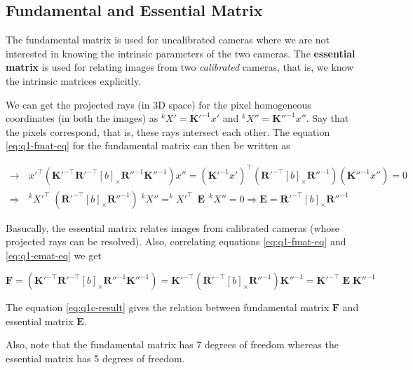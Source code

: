 
\subsection{Fundamental and Essential Matrix}

The fundamental matrix is used for uncalibrated cameras where we are not interested in knowing the intrinsic parameters of the two cameras. The \textbf{essential matrix} is used for relating images from two \textit{calibrated} cameras, that is, we know the intrinsic matrices explicitly.

We can get the projected rays (in 3D space) for the pixel homogeneous coordinates (in both the images) as $^kX' = \mathbf{K}'^{-1} x'$ and $^kX'' = \mathbf{K}''^{-1} x''$. Say that the pixels correspond, that is, these rays intersect each other. The equation \ref{eq:q1-fmat-eq} for the fundamental matrix can then be written as

\begin{align}
    \rightarrow& \,
    x'^\top \left ( \mathbf{K}'^{-\top} \mathbf{R}'^{-\top} \left [ b \right ]_\times \mathbf{R}''^{-1} \mathbf{K}''^{-1} \right ) x'' = \left ( \mathbf{K}'^{-1}x' \right )^\top  \left ( \mathbf{R}'^{-\top} \left [ b \right ]_\times \mathbf{R}''^{-1} \right ) \left ( \mathbf{K}''^{-1} x'' \right ) = 0
    \nonumber \\
    \Rightarrow& \, ^kX'^\top \; \left ( \mathbf{R}'^{-\top} \left [ b \right ]_\times \mathbf{R}''^{-1} \right ) \; ^kX'' = ^kX'^\top \;\, \mathbf{E} \;\, ^kX'' = 0
    \Rightarrow \mathbf{E} = \mathbf{R}'^{-\top} \left [ b \right ]_\times \mathbf{R}''^{-1}
    \label{eq:q1-emat-eq}
\end{align}

Basucally, the essential matrix relates images from calibrated cameras (whose projected rays can be resolved). Also, correlating equations \ref{eq:q1-fmat-eq} and \ref{eq:q1-emat-eq} we get

\begin{equation}
    \mathbf{F} = \left ( \mathbf{K}'^{-\top} \mathbf{R}'^{-\top} \left [ b \right ]_\times \mathbf{R}''^{-1} \mathbf{K}''^{-1} \right ) = \mathbf{K}'^{-\top} \left ( \mathbf{R}'^{-\top} \left [ b \right ]_\times \mathbf{R}''^{-1} \right ) \mathbf{K}''^{-1} = \mathbf{K}'^{-\top} \; \mathbf{E} \; \mathbf{K}''^{-1}
    \label{eq:q1c-result}
\end{equation}

The equation \ref{eq:q1c-result} gives the relation between fundamental matrix $\mathbf{F}$ and essential matrix $\mathbf{E}$.

Also, note that the fundamental matrix has 7 degrees of freedom whereas the essential matrix has 5 degrees of freedom.
